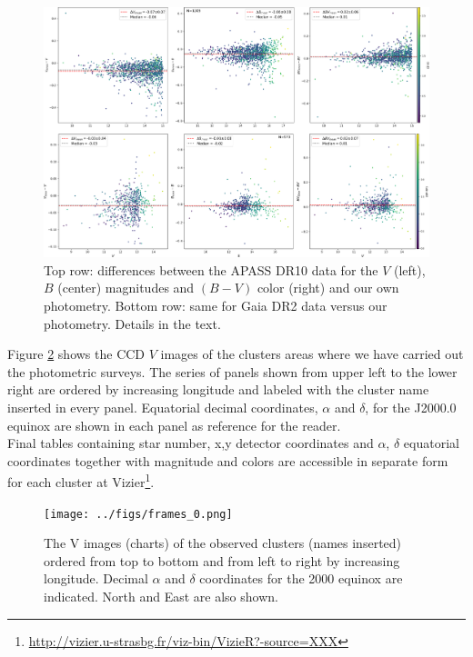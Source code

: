 \documentclass[draft]{aa}
\begin{document}
\begin{figure}[ht]
    \centering
     \includegraphics[width=\hsize]{../figs/apass_gaia_V_B_BV.png}   
\caption{Top row: differences between the APASS DR10 data for the $V$
(left), $B$ (center) magnitudes and $(B-V)$ color (right) and our own
photometry. Bottom row: same for Gaia DR2 data versus our photometry. Details
in the text.}
    \label{fig:gaia_transf}
\end{figure}

Figure \ref{fig:Vim} shows the CCD $V$ images of the clusters areas where we
have carried out the photometric surveys. The series of panels shown from upper
left to the lower right are ordered by increasing longitude and labeled
with the cluster name inserted in every panel. Equatorial decimal
coordinates, $\alpha$ and $\delta$, for the J2000.0 equinox are shown in each
panel as reference for the reader.\\

Final tables containing star number, x,y detector coordinates and $\alpha$,
$\delta$ equatorial coordinates together with magnitude and colors are
accessible in separate form for each cluster at
Vizier\footnote{\url{http://vizier.u-strasbg.fr/viz-bin/VizieR?-source=XXX}}.

\begin{figure}[htp]
    \centering
     \texttt{[image: ../figs/frames\_0.png]}   
\caption{The V images (charts) of the observed clusters (names inserted)
ordered from top to bottom and from left to right by increasing 
longitude. Decimal $\alpha$ and $\delta$ coordinates for the 2000 equinox are
indicated. North and East are also shown.}
    \label{fig:Vim}
\end{figure}
\end{document}
